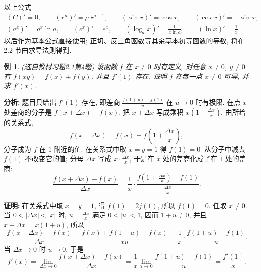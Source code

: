 \documentclass[UTF8,openany]{ctexbook}
\theoremstyle{chinesetextbook}
\newtheorem{example}{例}[section]
\newenvironment{cnproof}{\par\indent\textbf{证明:} \ignorespaces}{\par}
\begin{document}
以上公式
\[
\begin{gathered}
(C)'=0,\qquad(x^\mu)'=\mu x^{\mu-1},\qquad(\sin x)'=\cos x,\qquad(\cos x)'=-\sin x,\\
(a^x)'=a^x\ln a,\qquad(e^x)'=e^x,\qquad(\log_ax)'=\frac1{x\ln a},\qquad(\ln x)'=\frac1x
\end{gathered}
\]
以后作为基本公式直接使用; 正切、反三角函数等其余基本初等函数的导数, 将在 2.2 节由求导法则得到.
\begin{example}\label{ex:c2-h1-4}
\textnormal{(选自教材习题2.1第4题)} 设函数 $f$ 在 $x\ne0$ 时有定义, 对任意 $x\ne0$, $y\ne0$ 有 $f(xy)=f(x)+f(y)$, 并且 $f'(1)$ 存在. 证明 $f$ 在每一点 $x\ne0$ 可导, 并求 $f'(x)$.
\end{example}
\par\indent\textbf{分析:} 题目只给出 $f'(1)$ 存在, 即差商 $\displaystyle\frac{f(1+u)-f(1)}u$ 在 $u\to0$ 时有极限. 在点 $x$ 处差商的分子是 $f(x+\Delta x)-f(x)$. 把 $x+\Delta x$ 写成乘积 $\displaystyle x\left(1+\frac{\Delta x}x\right)$, 由所给的关系式,
\[
f(x+\Delta x)-f(x)=f\left(1+\frac{\Delta x}x\right),
\]
分子成为 $f$ 在 $1$ 附近的值. 在关系式中取 $x=y=1$ 得 $f(1)=0$, 从分子中减去 $f(1)$ 不改变它的值; 分母 $\Delta x$ 写成 $\displaystyle x\cdot\frac{\Delta x}x$, 于是在 $x$ 处的差商化成了在 $1$ 处的差商:
\[
\frac{f(x+\Delta x)-f(x)}{\Delta x}=\frac1x\cdot\frac{f\left(1+\frac{\Delta x}x\right)-f(1)}{\frac{\Delta x}x}.
\]
\begin{cnproof}
在关系式中取 $x=y=1$, 得 $f(1)=2f(1)$, 所以 $f(1)=0$. 任取 $x\ne0$. 当 $0<|\Delta x|<|x|$ 时, $\displaystyle u=\frac{\Delta x}x$ 满足 $0<|u|<1$, 因而 $1+u\ne0$, 并且 $x+\Delta x=x(1+u)$, 所以
\[
\frac{f(x+\Delta x)-f(x)}{\Delta x}=\frac{f(x)+f(1+u)-f(x)}{xu}=\frac1x\cdot\frac{f(1+u)-f(1)}u.
\]
当 $\Delta x\to0$ 时 $u\to0$, 于是
\[
f'(x)=\lim_{\Delta x\to0}\frac{f(x+\Delta x)-f(x)}{\Delta x}=\frac1x\lim_{u\to0}\frac{f(1+u)-f(1)}u=\frac{f'(1)}x.
\]
\end{cnproof}
\end{document}
